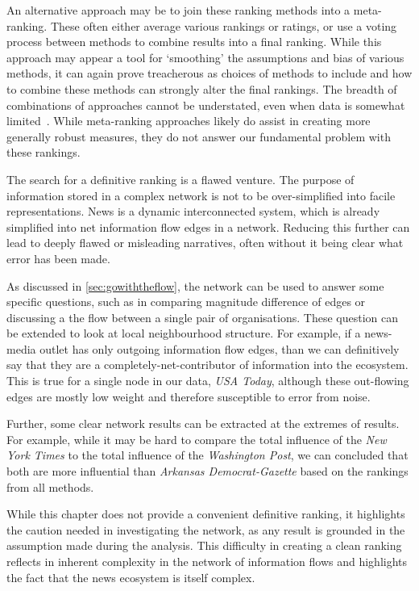 An alternative approach may be to join these ranking methods into a meta-ranking. These often either average various rankings or ratings, or use a voting process between methods to combine results into a final ranking. While this approach may appear a tool for `smoothing' the assumptions and bias of various methods, it can again prove treacherous as choices of methods to include and how to combine these methods can strongly alter the final rankings. The breadth of combinations of approaches cannot be understated, even when data is somewhat limited~\cite{BarrowRankingRankings2013}. While meta-ranking approaches likely do assist in creating more generally robust measures, they do not answer our fundamental problem with these rankings.

The search for a definitive ranking is a flawed venture. The purpose of information stored in a complex network is not to be over-simplified into facile representations. News is a dynamic interconnected system, which is already simplified into net information flow edges in a network. Reducing this further can lead to deeply flawed or misleading narratives, often without it being clear what error has been made. 

As discussed in \autoref{sec:gowiththeflow}, the network can be used to answer some specific questions, such as in comparing magnitude difference of edges or discussing a the flow between a single pair of organisations. These question can be extended to look at local neighbourhood structure. For example, if a news-media outlet has only outgoing information flow edges, than we can definitively say that they are a completely-net-contributor of information into the ecosystem. This is true for a single node in our data, \emph{USA Today}, although these out-flowing edges are mostly low weight and therefore susceptible to error from noise.

Further, some clear network results can be extracted at the extremes of results. For example, while it may be hard to compare the total influence of the \emph{New York Times} to the total influence of the \emph{Washington Post}, we can concluded that both are more influential than \emph{Arkansas Democrat-Gazette} based on the rankings from all methods. 

While this chapter does not provide a convenient definitive ranking, it highlights the caution needed in investigating the network, as any result is grounded in the assumption made during the analysis. This difficulty in creating a clean ranking reflects in inherent complexity in the network of information flows and highlights the fact that the news ecosystem is itself complex. 

